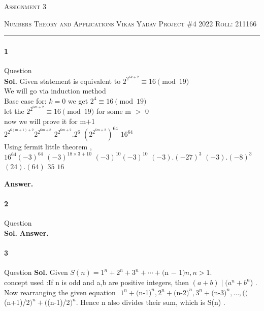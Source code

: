 \documentclass[12pt]{amsart}
\begin{document}
\thispagestyle{empty}
\begin{center}
    {\scshape \large  Assignment 3}
\end{center}
{\scshape Numbers Theory and Applications} \hfill 
\hfill {\scshape Vikas Yadav}
\linebreak
{\scshape Project \#4 2022}  \hfill {\scshape Roll: 211166}
\smallskip
\hrule
\bigskip

\paragraph*{1} Question
\bigskip \\
\textbf{Sol.}
Given statement is equivalent to $2^{2^{6k + 2}} \equiv 16 \pmod{19}$ \\
We will go via induction method \\
Base case for: $k=0$ we get $2^{4}\equiv 16 \pmod{19}$\\
let the $2^{2^{6m + 2}} \equiv 16 \pmod{19}$ for some m $>$ 0\\
now we will prove it for m$+$1\\
$2^{2^{6(m+ 1) + 2}} $\equiv $2^{2^{6m + 8}}$ \equiv $2^{2^{6m+ 2}}.2^{6}$ \equiv $(2^{2^{6m + 2}})^{64}$ \equiv $16^{64}$\\
Using fermit little theorem ,\\
$16^{64}$\equiv $(-3)^{64}$ \equiv $(-3)^{18\times 3+10}$  \equiv $(-3)^{10}$\equiv $(-3)^{10}$ \equiv $(-3).(-27)^{3}$ \equiv $(-3).(-8)^{3}$ \equiv $(24).(64)$ \equiv $35$ \equiv $16$  


\textbf{ Answer.}
\bigskip


\paragraph*{2} Question\\
\bigskip
\textbf{Sol.}
\textbf{ Answer.}
\bigskip
\paragraph*{3} Question
\bigskip
\textbf{Sol.}
Given $S(n)=1^n+2^n+3^n+⋯+($n − 1$)n ,  n>1 .$
\\
concept used :If  n  is odd and  a,b  are positive integers, then  $(a+b)∣(a^n+b^n$) .\\Now rearranging the given equation
$  $ $1^{n}+($n-1$)^n ,  2^n+($n-2$)^n ,  3^n+($n-3$)^n , … ,  (($(n+1)/2$)^n +($(n-1)/2$)^n $. Hence  n  also divides their sum, which is  S(n) .
\end{document}

